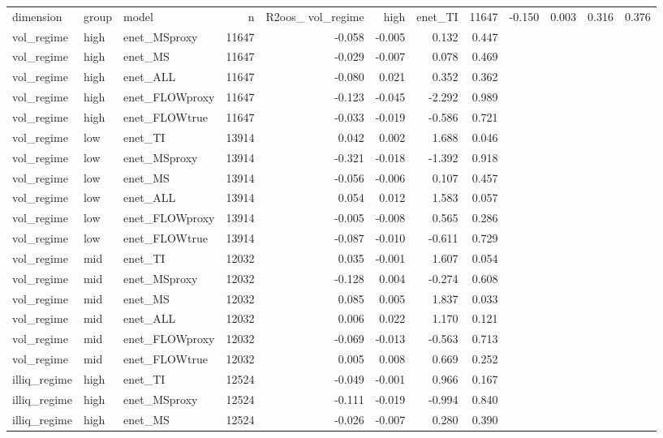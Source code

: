 \begin{tabular}{lllrrrrr}
\toprule
dimension & group & model & n & R2oos_%
\midrule
vol_regime & high & enet_TI & 11647 & -0.150 & 0.003 & 0.316 & 0.376 \\
vol_regime & high & enet_MSproxy & 11647 & -0.058 & -0.005 & 0.132 & 0.447 \\
vol_regime & high & enet_MS & 11647 & -0.029 & -0.007 & 0.078 & 0.469 \\
vol_regime & high & enet_ALL & 11647 & -0.080 & 0.021 & 0.352 & 0.362 \\
vol_regime & high & enet_FLOWproxy & 11647 & -0.123 & -0.045 & -2.292 & 0.989 \\
vol_regime & high & enet_FLOWtrue & 11647 & -0.033 & -0.019 & -0.586 & 0.721 \\
vol_regime & low & enet_TI & 13914 & 0.042 & 0.002 & 1.688 & 0.046 \\
vol_regime & low & enet_MSproxy & 13914 & -0.321 & -0.018 & -1.392 & 0.918 \\
vol_regime & low & enet_MS & 13914 & -0.056 & -0.006 & 0.107 & 0.457 \\
vol_regime & low & enet_ALL & 13914 & 0.054 & 0.012 & 1.583 & 0.057 \\
vol_regime & low & enet_FLOWproxy & 13914 & -0.005 & -0.008 & 0.565 & 0.286 \\
vol_regime & low & enet_FLOWtrue & 13914 & -0.087 & -0.010 & -0.611 & 0.729 \\
vol_regime & mid & enet_TI & 12032 & 0.035 & -0.001 & 1.607 & 0.054 \\
vol_regime & mid & enet_MSproxy & 12032 & -0.128 & 0.004 & -0.274 & 0.608 \\
vol_regime & mid & enet_MS & 12032 & 0.085 & 0.005 & 1.837 & 0.033 \\
vol_regime & mid & enet_ALL & 12032 & 0.006 & 0.022 & 1.170 & 0.121 \\
vol_regime & mid & enet_FLOWproxy & 12032 & -0.069 & -0.013 & -0.563 & 0.713 \\
vol_regime & mid & enet_FLOWtrue & 12032 & 0.005 & 0.008 & 0.669 & 0.252 \\
illiq_regime & high & enet_TI & 12524 & -0.049 & -0.001 & 0.966 & 0.167 \\
illiq_regime & high & enet_MSproxy & 12524 & -0.111 & -0.019 & -0.994 & 0.840 \\
illiq_regime & high & enet_MS & 12524 & -0.026 & -0.007 & 0.280 & 0.390 \\

\end{tabular}
